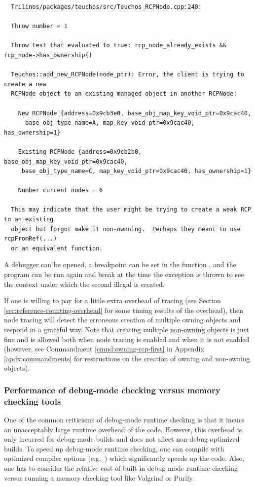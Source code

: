 \documentclass[pdf,ps2pdf,11pt]{SANDreport}
\begin{document}
{\small\begin{verbatim}
  Trilinos/packages/teuchos/src/Teuchos_RCPNode.cpp:240:
  
  Throw number = 1
  
  Throw test that evaluated to true: rcp_node_already_exists && rcp_node->has_ownership()
  
  Teuchos::add_new_RCPNode(node_ptr): Error, the client is trying to create a new
  RCPNode object to an existing managed object in another RCPNode:
  
    New RCPNode {address=0x9cb3e0, base_obj_map_key_void_ptr=0x9cac40,
      base_obj_type_name=A, map_key_void_ptr=0x9cac40, has_ownership=1}
  
    Existing RCPNode {address=0x9cb2b0, base_obj_map_key_void_ptr=0x9cac40,
     base_obj_type_name=C, map_key_void_ptr=0x9cac40, has_ownership=1}
  
    Number current nodes = 6
  
  This may indicate that the user might be trying to create a weak RCP to an existing
  object but forgot make it non-ownning.  Perhaps they meant to use rcpFromRef(...)
  or an equivalent function.
\end{verbatim}}


A debugger can be opened, a breakpoint can be set in the function
{}, and the program can be run again
and break at the time the exception is thrown to see the context under
which the second illegal {} is created.

If one is willing to pay for a little extra overhead of
{} tracing (see Section
{}\ref{sec:reference-counting-overhead} for some timing results of the
overhead), then node tracing will detect the erroneous creation of
multiple owning {} objects and respond in a graceful way.
Note that creating multiple {}\underline{non-owning} {}
objects is just fine and is allowed both when node tracing is enabled
and when it is not enabled (however, see Commandment
{}\ref{cmnd:owning-rcp-first} in Appendix {}\ref{apdx:commandments}
for restructions on the creation of owning and non-owning {}
objects).


%
{}\subsubsection{Performance of debug-mode checking versus memory
checking tools}
%

One of the common criticisms of debug-mode runtime checking is that it
incurs an unacceptably large runtime overhead of the code.  However,
this overhead is only incurred for debug-mode builds and does not
affect non-debug optimized builds.  To speed up debug-mode runtime
checking, one can compile with optimized compiler options (e.g.\
{}) which significantly speeds up the code.  Also, one has to
consider the relative cost of built-in debug-mode runtime checking
versus running a memory checking tool like Valgrind or Purify.
\end{document}
